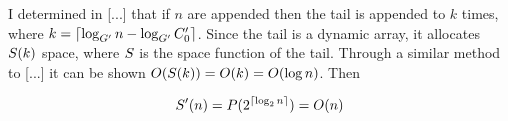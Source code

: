 I determined in [...] that if $n$ are appended then the tail is appended to $k$ times, where $k = \lceil \log_{G'} n - \log_{G'} C_0' \rceil$. Since the tail is a dynamic array, it allocates $S(k)$ space, where $S$ is the space function of the tail. Through a similar method to [...] it can be shown $O(S(k)) = O(k) = O(\log n)$. Then %

\begin{align*}
S'(n) = P(2^{\lceil \log_2 n \rceil}) = O(n)
\end{align*}